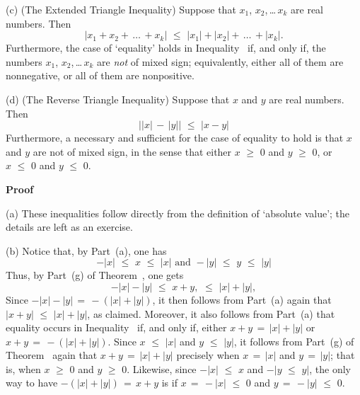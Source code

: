 \V

        (c) (The Extended Triangle Inequality) Suppose that $x_{1}$, $x_{2}$,\,{\ldots}\,$x_{k}$ are real numbers.
    Then
        \begin{equation}
        \label{IneqB.35B}
        |x_{1} + x_{2} + \,{\ldots}\, + x_{k}|\,\,{\leq}\,\,|x_{1}| + |x_{2}| + \,{\ldots}\,+ |x_{k}|.
        \end{equation}
    Furthermore, the case of `equality' holds in Inequality~ if, and only if,
    the numbers $x_{1}$, $x_{2}$,\,{\ldots}\,$x_{k}$ are {\em not} of mixed sign;
    equivalently, either all of them are nonnegative, or all of them are nonpositive.

\V

        (d) (The Reverse Triangle Inequality) Suppose that $x$ and $y$ are real numbers. Then
        \begin{equation}
        \label{IneqB.35C}
        ||x| \,-\, |y||\,\,{\leq}\,\,|x-y|
        \end{equation}
    Furthermore, a necessary and sufficient for the case of equality to hold is that $x$ and $y$ are not of mixed sign,
    in the sense that either $x\,\,{\geq}\,\,0$ and $y\,\,{\geq}\,\,0$, or $x\,\,{\leq}\,\,0$ and $y\,\,{\leq}\,\,0$.

\V

        {\bf Proof}

\V

        (a) These inequalities follow directly from the definition of `absolute value'; the details are left as an exercise.

\V

        (b) Notice that, by Part~(a), one has
        \begin{displaymath}
        -|x|\,\,{\leq}\,\,x\,\,{\leq}\,\,|x|
    \mbox{ and }
        -|y|\,\,{\leq}\,\,y\,\,{\leq}\,\,|y|
        \end{displaymath}
    Thus, by Part~(g) of Theorem~, one gets
        \begin{displaymath}
        -|x|-|y|\,\,{\leq}\,\,x+y,\,\,{\leq}\,\,|x| + |y|,
        \end{displaymath}
    Since $-|x|-|y| \,=\, -(|x|+|y|)$, it then follows from Part~(a) again that $|x+y|\,\,{\leq}\,\,|x|+|y|$, as claimed.
    Moreover, it also follows from Part~(a) that equality occurs in Inequality~ if, and only if, either $x+y \,=\, |x|+|y|$ or $x+y \,=\, -(|x|+ |y|)$.
    Since $x\,\,{\leq}\,\,|x|$ and $y\,\,{\leq}\,\,|y|$, it follows from Part~(g) of Theorem~ again that
    $x+y \,=\, |x|+|y|$ precisely when $x \,=\, |x|$ and $y \,=\, |y|$; that is, when $x\,\,{\geq}\,\,0$ and $y\,\,{\geq}\,\,0$.
    Likewise, since $-|x|\,\,{\leq}\,\,x$ and $-|y\,\,{\leq}\,\,y|$, the only way to have $-(|x|+|y|) \,=\, x+y$ is if $x \,=\, -|x|\,\,{\leq}\,\,0$ and $y \,=\, -|y|\,\,{\leq}\,\,0$.

